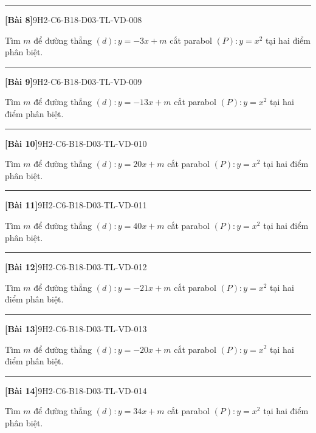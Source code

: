 \documentclass[12pt,a4paper]{article}
\newif\ifloigiai
\newenvironment{cauhoi}[2]{%
  \par\medskip\noindent\rule{\textwidth}{0.4pt}\par\nopagebreak
  \noindent\textbf{[#1]}\hfill{\scriptsize\ttfamily #2}\par\nopagebreak\smallskip}{\par}
\newcommand{\loigiai}[1]{\ifloigiai\par\smallskip\noindent\textit{Lời giải.} #1\par\fi}
\begin{document}
\begin{cauhoi}{Bài 8}{9H2-C6-B18-D03-TL-VD-008}
Tìm $m$ để đường thẳng $(d): y=-3x+m$ cắt parabol $(P): y=x^{2}$ tại hai điểm phân biệt.
\loigiai{Phương trình hoành độ giao điểm $x^{2}+3x-m=0$. Để $(d)$ cắt $(P)$ tại hai điểm phân biệt cần $\Delta=9+4m>0$, suy ra $m>-\dfrac{9}{4}$.}
\end{cauhoi}
\begin{cauhoi}{Bài 9}{9H2-C6-B18-D03-TL-VD-009}
Tìm $m$ để đường thẳng $(d): y=-13x+m$ cắt parabol $(P): y=x^{2}$ tại hai điểm phân biệt.
\loigiai{Phương trình hoành độ giao điểm $x^{2}+13x-m=0$. Để $(d)$ cắt $(P)$ tại hai điểm phân biệt cần $\Delta=169+4m>0$, suy ra $m>-\dfrac{169}{4}$.}
\end{cauhoi}
\begin{cauhoi}{Bài 10}{9H2-C6-B18-D03-TL-VD-010}
Tìm $m$ để đường thẳng $(d): y=20x+m$ cắt parabol $(P): y=x^{2}$ tại hai điểm phân biệt.
\loigiai{Phương trình hoành độ giao điểm $x^{2}-20x-m=0$. Để $(d)$ cắt $(P)$ tại hai điểm phân biệt cần $\Delta=400+4m>0$, suy ra $m>-100$.}
\end{cauhoi}
\begin{cauhoi}{Bài 11}{9H2-C6-B18-D03-TL-VD-011}
Tìm $m$ để đường thẳng $(d): y=40x+m$ cắt parabol $(P): y=x^{2}$ tại hai điểm phân biệt.
\loigiai{Phương trình hoành độ giao điểm $x^{2}-40x-m=0$. Để $(d)$ cắt $(P)$ tại hai điểm phân biệt cần $\Delta=1600+4m>0$, suy ra $m>-400$.}
\end{cauhoi}
\begin{cauhoi}{Bài 12}{9H2-C6-B18-D03-TL-VD-012}
Tìm $m$ để đường thẳng $(d): y=-21x+m$ cắt parabol $(P): y=x^{2}$ tại hai điểm phân biệt.
\loigiai{Phương trình hoành độ giao điểm $x^{2}+21x-m=0$. Để $(d)$ cắt $(P)$ tại hai điểm phân biệt cần $\Delta=441+4m>0$, suy ra $m>-\dfrac{441}{4}$.}
\end{cauhoi}
\begin{cauhoi}{Bài 13}{9H2-C6-B18-D03-TL-VD-013}
Tìm $m$ để đường thẳng $(d): y=-20x+m$ cắt parabol $(P): y=x^{2}$ tại hai điểm phân biệt.
\loigiai{Phương trình hoành độ giao điểm $x^{2}+20x-m=0$. Để $(d)$ cắt $(P)$ tại hai điểm phân biệt cần $\Delta=400+4m>0$, suy ra $m>-100$.}
\end{cauhoi}
\begin{cauhoi}{Bài 14}{9H2-C6-B18-D03-TL-VD-014}
Tìm $m$ để đường thẳng $(d): y=34x+m$ cắt parabol $(P): y=x^{2}$ tại hai điểm phân biệt.
\loigiai{Phương trình hoành độ giao điểm $x^{2}-34x-m=0$. Để $(d)$ cắt $(P)$ tại hai điểm phân biệt cần $\Delta=1156+4m>0$, suy ra $m>-289$.}
\end{cauhoi}
\end{document}
